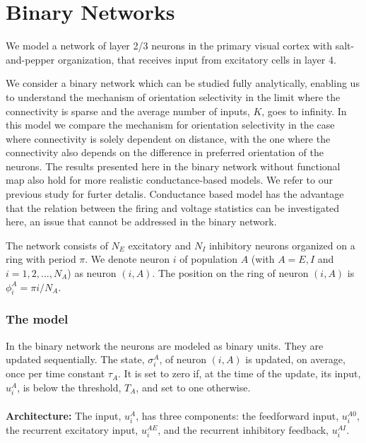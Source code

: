 \section{\label{appendix1}Binary Networks}
We model a network of layer 2/3 neurons in the primary visual cortex with salt-and-pepper
organization, that receives input from excitatory cells in layer 4. 

We consider a binary network which can be studied fully analytically, enabling us to 
understand the mechanism of orientation selectivity in the limit where the 
connectivity is sparse and the average number of inputs, $K$, goes to infinity.
In this model we compare the mechanism for orientation selectivity in the
case where connectivity is solely dependent on distance, with the one where
the connectivity also depends on the difference in preferred orientation of 
the neurons.
The results presented here in the binary network without functional map also hold for more realistic conductance-based models. We refer to our previous study \cite{} for furter detalis. Conductance based model has the advantage that the relation between the firing and voltage statistics 
can be investigated here, an issue that cannot be addressed in the binary network.
 
The network consists of $N_E$ excitatory and $N_I$ inhibitory 
neurons organized on a ring with  period $\pi$\@. We denote neuron $i$ of 
population $A$ (with $A=E,I$ and $i=1,2,\ldots,N_A$) as neuron $(i,A)$. 
The position on the ring of neuron $(i,A)$ is $\phi_i^A=\pi i/N_A$.


\subsubsection*{The model}
In the binary network the neurons are modeled as binary units. They are 
updated sequentially. The state, $\sigma_i^A$, of neuron $(i,A)$ is updated, 
on average, once per time constant $\tau_A$\@. It is set to zero if, at the 
time of the update, its input, $u_i^A$, is below the threshold, $T_A$, 
and set to one otherwise. \\
 \\
{\noindent \bf Architecture:} The input, $u_i^A$, has three 
components: the feedforward input, $u_i^{A0}$, the recurrent excitatory input, 
$u_i^{AE}$, and the recurrent inhibitory feedback, $u_i^{AI}$\@. 

